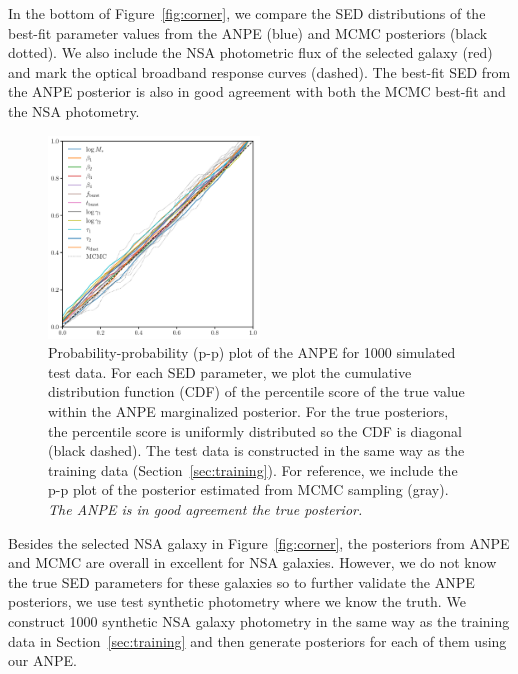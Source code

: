 In the bottom of Figure~\ref{fig:corner}, we compare the SED distributions of
the best-fit parameter values from the ANPE (blue) and MCMC posteriors (black
dotted). 
We also include the NSA photometric flux of the selected galaxy (red) and mark
the optical broadband response curves (dashed). 
The best-fit SED from the ANPE posterior is also in good agreement with both
the MCMC best-fit and the NSA photometry.  


\begin{figure}
\begin{center}
    \includegraphics[width=0.5\textwidth]{figs/ppplot.pdf}
    \caption{\label{fig:pp}
    Probability-probability (p-p) plot of the ANPE for 1000 simulated test data. 
    For each SED parameter, we plot the cumulative distribution function (CDF) of the
    percentile score of the true value within the ANPE marginalized posterior.
    For the true posteriors, the percentile score is uniformly distributed so
    the CDF is diagonal (black dashed).
    The test data is constructed in the same way as the training data
    (Section~\ref{sec:training}). 
    For reference, we include the p-p plot of the posterior estimated from MCMC
    sampling (gray). 
    \emph{The ANPE is in good agreement the true posterior.}
    }
\end{center}
\end{figure}
Besides the selected NSA galaxy in Figure~\ref{fig:corner}, the posteriors from
ANPE and MCMC are overall in excellent for NSA galaxies.
However, we do not know the true SED parameters for these galaxies so to
further validate the ANPE posteriors, we use test synthetic photometry where
we know the truth.
We construct 1000 synthetic NSA galaxy photometry in the same way as the
training data in Section~\ref{sec:training} and then generate posteriors for
each of them using our ANPE. 

